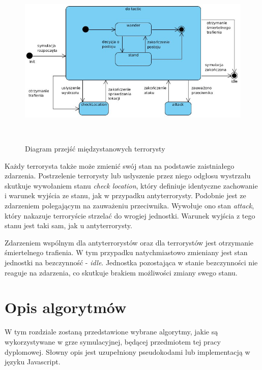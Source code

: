 \begin{figure}
\begin{center}
	\includegraphics[width=160mm,height=84mm]{images/terTactic}
	\caption{Diagram przejść międzystanowych terrorysty\label{terTacticImage}}
\end{center}
\end{figure}

Każdy terrorysta także może zmienić swój stan na podstawie zaistniałego zdarzenia. Postrzelenie terrorysty lub usłyszenie przez niego odgłosu wystrzału skutkuje wywołaniem stanu \emph{check location}, który definiuje identyczne zachowanie i warunek wyjścia ze stanu, jak w przypadku antyterrorysty. Podobnie jest ze zdarzeniem polegającym na zauważeniu przeciwnika. Wywołuje ono stan \emph{attack}, który nakazuje terroryście strzelać do wrogiej jednostki. Warunek wyjścia z tego stanu jest taki sam, jak u antyterrorysty.

Zdarzeniem wspólnym dla antyterrorystów oraz dla terrorystów jest otrzymanie śmiertelnego trafienia. W tym przypadku natychmiastowo zmieniany jest stan jednostki na bezczynność - \emph{idle}. Jednostka pozostająca w stanie bezczynności nie reaguje na zdarzenia, co skutkuje brakiem możliwości zmiany swego stanu.


\section{Opis algorytmów}
W tym rozdziale zostaną przedstawione wybrane algorytmy, jakie są wykorzystywane w grze symulacyjnej, będącej przedmiotem tej pracy dyplomowej. Słowny opis jest uzupełniony pseudokodami lub implementacją w języku Javascript.

